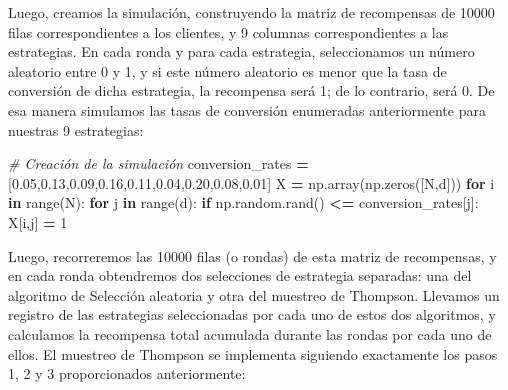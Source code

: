 \documentclass[]{book}
\newenvironment{Shaded}{\begin{snugshade}}{\end{snugshade}}
\newcommand{\BuiltInTok}[1]{#1}
\newcommand{\CommentTok}[1]{\textcolor[rgb]{0.56,0.35,0.01}{\textit{#1}}}
\newcommand{\ControlFlowTok}[1]{\textcolor[rgb]{0.13,0.29,0.53}{\textbf{#1}}}
\newcommand{\DecValTok}[1]{\textcolor[rgb]{0.00,0.00,0.81}{#1}}
\newcommand{\FloatTok}[1]{\textcolor[rgb]{0.00,0.00,0.81}{#1}}
\newcommand{\KeywordTok}[1]{\textcolor[rgb]{0.13,0.29,0.53}{\textbf{#1}}}
\newcommand{\NormalTok}[1]{#1}
\newcommand{\OperatorTok}[1]{\textcolor[rgb]{0.81,0.36,0.00}{\textbf{#1}}}
\begin{document}
Luego, creamos la simulación, construyendo la matriz de recompensas de 10000 filas correspondientes a los clientes, y 9 columnas correspondientes a las estrategias. En cada ronda y para cada estrategia, seleccionamos un número aleatorio entre 0 y 1, y si este número aleatorio es menor que la tasa de conversión de dicha estrategia, la recompensa será 1; de lo contrario, será 0. De esa manera simulamos las tasas de conversión enumeradas anteriormente para nuestras 9 estrategias:

\begin{Shaded}
\begin{Highlighting}[]
\CommentTok{# Creación de la simulación}
\NormalTok{conversion_rates }\OperatorTok{=}\NormalTok{ [}\FloatTok{0.05}\NormalTok{,}\FloatTok{0.13}\NormalTok{,}\FloatTok{0.09}\NormalTok{,}\FloatTok{0.16}\NormalTok{,}\FloatTok{0.11}\NormalTok{,}\FloatTok{0.04}\NormalTok{,}\FloatTok{0.20}\NormalTok{,}\FloatTok{0.08}\NormalTok{,}\FloatTok{0.01}\NormalTok{]}
\NormalTok{X }\OperatorTok{=}\NormalTok{ np.array(np.zeros([N,d]))}
\ControlFlowTok{for}\NormalTok{ i }\KeywordTok{in} \BuiltInTok{range}\NormalTok{(N):}
    \ControlFlowTok{for}\NormalTok{ j }\KeywordTok{in} \BuiltInTok{range}\NormalTok{(d):}
        \ControlFlowTok{if}\NormalTok{ np.random.rand() }\OperatorTok{<=}\NormalTok{ conversion_rates[j]:}
\NormalTok{            X[i,j] }\OperatorTok{=} \DecValTok{1}
\end{Highlighting}
\end{Shaded}

Luego, recorreremos las 10000 filas (o rondas) de esta matriz de recompensas, y en cada ronda obtendremos dos selecciones de estrategia separadas: una del algoritmo de Selección aleatoria y otra del muestreo de Thompson. Llevamos un registro de las estrategias seleccionadas por cada uno de estos dos algoritmos, y calculamos la recompensa total acumulada durante las rondas por cada uno de ellos. El muestreo de Thompson se implementa siguiendo exactamente los pasos 1, 2 y 3 proporcionados anteriormente:
\end{document}
